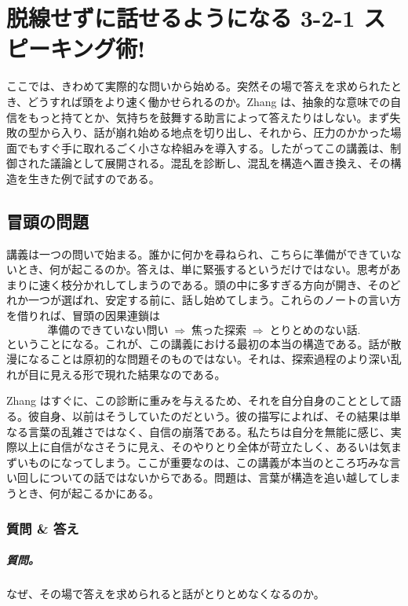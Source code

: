\chapter{脱線せずに話せるようになる 3-2-1 スピーキング術!}

ここでは、きわめて実際的な問いから始める。突然その場で答えを求められたとき、どうすれば頭をより速く働かせられるのか。Zhang は、抽象的な意味での自信をもっと持てとか、気持ちを鼓舞する助言によって答えたりはしない。まず失敗の型から入り、話が崩れ始める地点を切り出し、それから、圧力のかかった場面でもすぐ手に取れるごく小さな枠組みを導入する。したがってこの講義は、制御された議論として展開される。混乱を診断し、混乱を構造へ置き換え、その構造を生きた例で試すのである。

\section{冒頭の問題}

講義は一つの問いで始まる。誰かに何かを尋ねられ、こちらに準備ができていないとき、何が起こるのか。答えは、単に緊張するというだけではない。思考があまりに速く枝分かれしてしまうのである。頭の中に多すぎる方向が開き、そのどれか一つが選ばれ、安定する前に、話し始めてしまう。これらのノートの言い方を借りれば、冒頭の因果連鎖は
\begin{equation}
\text{準備のできていない問い}
\;\Rightarrow\;
\text{焦った探索}
\;\Rightarrow\;
\text{とりとめのない話}.
\end{equation}
ということになる。これが、この講義における最初の本当の構造である。話が散漫になることは原初的な問題そのものではない。それは、探索過程のより深い乱れが目に見える形で現れた結果なのである。

Zhang はすぐに、この診断に重みを与えるため、それを自分自身のこととして語る。彼自身、以前はそうしていたのだという。彼の描写によれば、その結果は単なる言葉の乱雑さではなく、自信の崩落である。私たちは自分を無能に感じ、実際以上に自信がなさそうに見え、そのやりとり全体が苛立たしく、あるいは気まずいものになってしまう。ここが重要なのは、この講義が本当のところ巧みな言い回しについての話ではないからである。問題は、言葉が構造を追い越してしまうとき、何が起こるかにある。

\subsection{質問 \& 答え}

\paragraph{質問。} なぜ、その場で答えを求められると話がとりとめなくなるのか。

